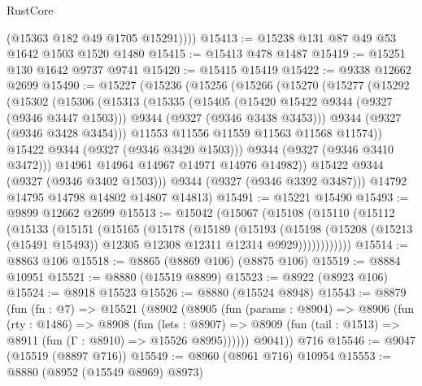 \begin{lexlean}{RustCore}
\begin{coremodule}
          (@15363 @182 @49 @1705 @15291))))
@15413 := @15238 @131 @87 @49 @53 @1642 @1503 @1520 @1480
@15415 := @15413 @478 @1487
@15419 := @15251 @130 @1642 @9737 @9741
@15420 := @15415 @15419
@15422 := @9338 @12662 @2699
@15490 := @15227
    (@15236
      (@15256
        (@15266
          (@15270
            (@15277
              (@15292
                (@15302
                  (@15306
                    (@15313
                      (@15335
                        (@15405
                          (@15420 @15422 @9344 (@9327 (@9346 @3447 @1503)))
                          @9344
                          (@9327 (@9346 @3438 @3453)))
                        @9344
                        (@9327 (@9346 @3428 @3454)))
                      @11553
                      @11556
                      @11559
                      @11563
                      @11568
                      @11574))
                  @15422
                  @9344
                  (@9327 (@9346 @3420 @1503)))
                @9344
                (@9327 (@9346 @3410 @3472)))
              @14961
              @14964
              @14967
              @14971
              @14976
              @14982))
          @15422
          @9344
          (@9327 (@9346 @3402 @1503)))
        @9344
        (@9327 (@9346 @3392 @3487)))
      @14792
      @14795
      @14798
      @14802
      @14807
      @14813)
@15491 := @15221 @15490
@15493 := @9899 @12662 @2699
@15513 := @15042
    (@15067
      (@15108
        (@15110
          (@15112
            (@15133
              (@15151
                (@15165
                  (@15178
                    (@15189
                      (@15193
                        (@15198
                          (@15208
                            (@15213 (@15491 @15493))
                            @12305
                            @12308
                            @12311
                            @12314
                            @9929))))))))))))
@15514 := @8863 @106
@15518 := @8865 (@8869 @106) (@8875 @106)
@15519 := @8884 @10951
@15521 := @8880 (@15519 @8899)
@15523 := @8922 (@8923 @106)
@15524 := @8918 @15523
@15526 := @8880 (@15524 @8948)
@15543 := @8879
    (fun (fn : @7) =>
    @15521
      (@8902
        (@8905
          (fun (params : @8904) =>
          @8906
            (fun (rty : @1486) =>
            @8908
              (fun (lets : @8907) =>
              @8909 (fun (tail : @1513) => @8911 (fun (Γ : @8910) => @15526 @8995))))))
        @9041))
    @716
@15546 := @9047 (@15519 (@8897 @716))
@15549 := @8960 (@8961 @716) @10954
@15553 := @8880 (@8952 (@15549 @8969) @8973)

\end{coremodule}
\end{lexlean}
